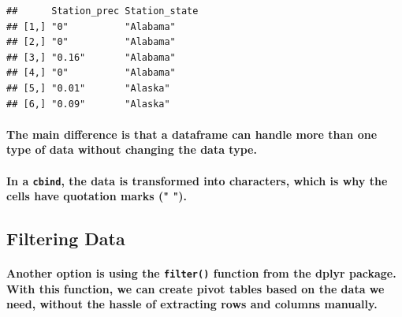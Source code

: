 \documentclass[
]{article}
\let\oldparagraph\paragraph
\renewcommand{\paragraph}[1]{\oldparagraph{#1}\mbox{}}
\begin{document}
\begin{verbatim}
##      Station_prec Station_state
## [1,] "0"          "Alabama"    
## [2,] "0"          "Alabama"    
## [3,] "0.16"       "Alabama"    
## [4,] "0"          "Alabama"    
## [5,] "0.01"       "Alaska"     
## [6,] "0.09"       "Alaska"
\end{verbatim}

\hypertarget{the-main-difference-is-that-a-dataframe-can-handle-more-than-one-type-of-data-without-changing-the-data-type.}{%
\paragraph{The main difference is that a dataframe can handle more than
one type of data without changing the data
type.}\label{the-main-difference-is-that-a-dataframe-can-handle-more-than-one-type-of-data-without-changing-the-data-type.}}

\hypertarget{in-a-cbind-the-data-is-transformed-into-characters-which-is-why-the-cells-have-quotation-marks-.}{%
\paragraph{\texorpdfstring{In a \texttt{cbind}, the data is transformed
into characters, which is why the cells have quotation marks ("
").}{In a cbind, the data is transformed into characters, which is why the cells have quotation marks (" ").}}\label{in-a-cbind-the-data-is-transformed-into-characters-which-is-why-the-cells-have-quotation-marks-.}}

\hypertarget{filtering-data}{%
\subsection{Filtering Data}\label{filtering-data}}

\hypertarget{another-option-is-using-the-filter-function-from-the-dplyr-package.-with-this-function-we-can-create-pivot-tables-based-on-the-data-we-need-without-the-hassle-of-extracting-rows-and-columns-manually.}{%
\paragraph{\texorpdfstring{Another option is using the \texttt{filter()}
function from the \textbf{dplyr} package. With this function, we can
create pivot tables based on the data we need, without the hassle of
extracting rows and columns
manually.}{Another option is using the filter() function from the dplyr package. With this function, we can create pivot tables based on the data we need, without the hassle of extracting rows and columns manually.}}\label{another-option-is-using-the-filter-function-from-the-dplyr-package.-with-this-function-we-can-create-pivot-tables-based-on-the-data-we-need-without-the-hassle-of-extracting-rows-and-columns-manually.}}
\end{document}
